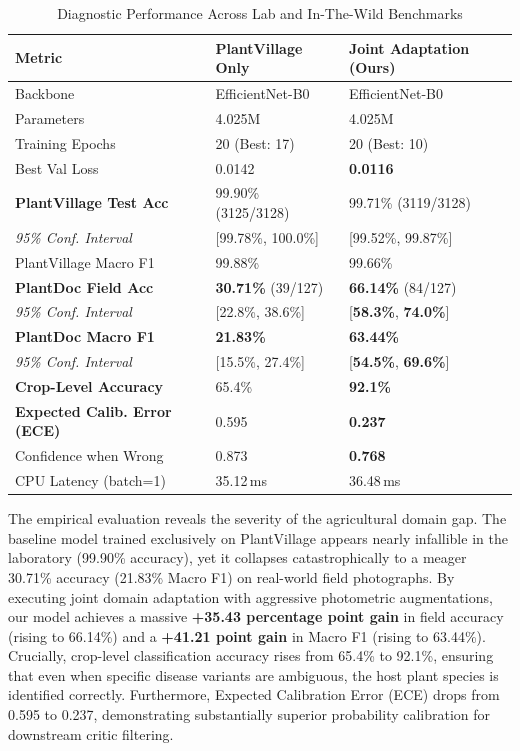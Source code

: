 \documentclass[conference]{IEEEtran}
\begin{document}
\begin{table}[htbp]
\caption{Diagnostic Performance Across Lab and In-The-Wild Benchmarks}
\label{tab:vision_results}
\begin{center}
\begin{tabularx}{\columnwidth}{lXX}
\toprule
\textbf{Metric} & \textbf{PlantVillage Only} & \textbf{Joint Adaptation (Ours)} \\
\midrule
Backbone & EfficientNet-B0 & EfficientNet-B0 \\
Parameters & 4.025M & 4.025M \\
Training Epochs & 20 (Best: 17) & 20 (Best: 10) \\
Best Val Loss & 0.0142 & \textbf{0.0116} \\
\midrule
\textbf{PlantVillage Test Acc} & 99.90\% (3125/3128) & 99.71\% (3119/3128) \\
\textit{95\% Conf. Interval} & [99.78\%, 100.0\%] & [99.52\%, 99.87\%] \\
PlantVillage Macro F1 & 99.88\% & 99.66\% \\
\midrule
\textbf{PlantDoc Field Acc} & \textbf{30.71\%} (39/127) & \textbf{66.14\%} (84/127) \\
\textit{95\% Conf. Interval} & [22.8\%, 38.6\%] & [\textbf{58.3\%}, \textbf{74.0\%}] \\
\textbf{PlantDoc Macro F1} & \textbf{21.83\%} & \textbf{63.44\%} \\
\textit{95\% Conf. Interval} & [15.5\%, 27.4\%] & [\textbf{54.5\%}, \textbf{69.6\%}] \\
\midrule
\textbf{Crop-Level Accuracy} & 65.4\% & \textbf{92.1\%} \\
\textbf{Expected Calib. Error (ECE)} & 0.595 & \textbf{0.237} \\
Confidence when Wrong & 0.873 & \textbf{0.768} \\
CPU Latency (batch=1) & 35.12\,ms & 36.48\,ms \\
\bottomrule
\end{tabularx}
\end{center}
\end{table}

The empirical evaluation reveals the severity of the agricultural domain gap. The baseline model trained exclusively on PlantVillage appears nearly infallible in the laboratory (99.90\% accuracy), yet it collapses catastrophically to a meager 30.71\% accuracy (21.83\% Macro F1) on real-world field photographs. By executing joint domain adaptation with aggressive photometric augmentations, our model achieves a massive \textbf{+35.43 percentage point gain} in field accuracy (rising to 66.14\%) and a \textbf{+41.21 point gain} in Macro F1 (rising to 63.44\%). Crucially, crop-level classification accuracy rises from 65.4\% to 92.1\%, ensuring that even when specific disease variants are ambiguous, the host plant species is identified correctly. Furthermore, Expected Calibration Error (ECE) drops from 0.595 to 0.237, demonstrating substantially superior probability calibration for downstream critic filtering.
\end{document}
